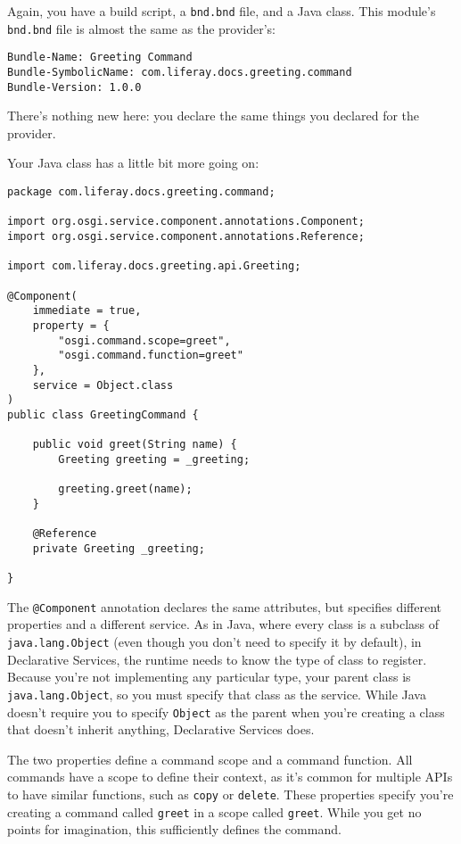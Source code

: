 Again, you have a build script, a \texttt{bnd.bnd} file, and a Java
class. This module's \texttt{bnd.bnd} file is almost the same as the
provider's:

\begin{verbatim}
Bundle-Name: Greeting Command
Bundle-SymbolicName: com.liferay.docs.greeting.command
Bundle-Version: 1.0.0
\end{verbatim}

There's nothing new here: you declare the same things you declared for
the provider.

Your Java class has a little bit more going on:

\begin{verbatim}
package com.liferay.docs.greeting.command;

import org.osgi.service.component.annotations.Component;
import org.osgi.service.component.annotations.Reference;

import com.liferay.docs.greeting.api.Greeting;

@Component(
    immediate = true,
    property = {
        "osgi.command.scope=greet",
        "osgi.command.function=greet"
    },
    service = Object.class
)
public class GreetingCommand {

    public void greet(String name) {
        Greeting greeting = _greeting;

        greeting.greet(name);
    }

    @Reference
    private Greeting _greeting;

}
\end{verbatim}

The \texttt{@Component} annotation declares the same attributes, but
specifies different properties and a different service. As in Java,
where every class is a subclass of \texttt{java.lang.Object} (even
though you don't need to specify it by default), in Declarative
Services, the runtime needs to know the type of class to register.
Because you're not implementing any particular type, your parent class
is \texttt{java.lang.Object}, so you must specify that class as the
service. While Java doesn't require you to specify \texttt{Object} as
the parent when you're creating a class that doesn't inherit anything,
Declarative Services does.

The two properties define a command scope and a command function. All
commands have a scope to define their context, as it's common for
multiple APIs to have similar functions, such as \texttt{copy} or
\texttt{delete}. These properties specify you're creating a command
called \texttt{greet} in a scope called \texttt{greet}. While you get no
points for imagination, this sufficiently defines the command.

